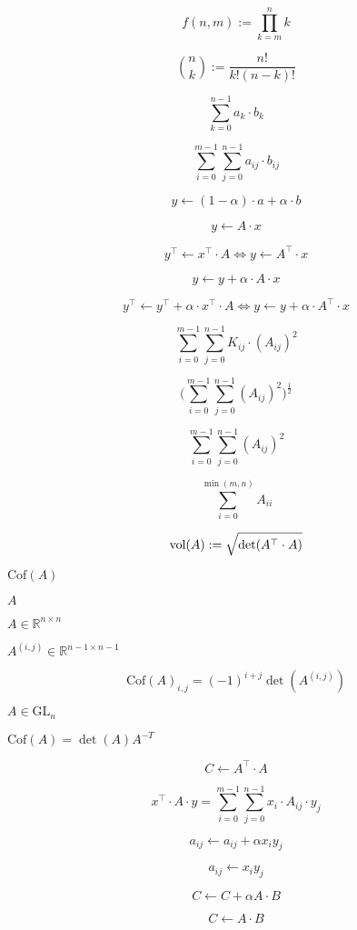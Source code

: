 \documentclass{article}
\begin{document}
\[ f(n,m) := \prod_{k=m}^n k \]
\pagebreak

\[ {n \choose k} := \frac{n!}{k!(n-k)!} \]
\pagebreak

\[\sum_{k=0}^{n-1} a_k\cdot b_k\]
\pagebreak

\[\sum_{i=0}^{m-1} \sum_{j=0}^{n-1} a_{ij} \cdot b_{ij}\]
\pagebreak

\[ y \leftarrow (1-\alpha)\cdot a + \alpha\cdot b \]
\pagebreak

\[ y \leftarrow A\cdot x \]
\pagebreak

\[ y^\top \leftarrow x^\top \cdot A \Longleftrightarrow y \leftarrow A^\top\cdot x \]
\pagebreak

\[ y \leftarrow y + \alpha\cdot A\cdot x \]
\pagebreak

\[ y^\top \leftarrow y^\top + \alpha\cdot x^\top \cdot A \Longleftrightarrow y \leftarrow y + \alpha\cdot A^\top\cdot x \]
\pagebreak

\[ \sum_{i=0}^{m-1}\sum_{j=0}^{n-1} K_{ij}\cdot (A_{ij})^2 \]
\pagebreak

\[ \Big(\sum_{i=0}^{m-1}\sum_{j=0}^{n-1} (A_{ij})^2\Big)^{\frac{1}{2}} \]
\pagebreak

\[ \sum_{i=0}^{m-1}\sum_{j=0}^{n-1} (A_{ij})^2\]
\pagebreak

\[ \sum_{i=0}^{\min(m,n)} A_{ii}\]
\pagebreak

\[ \textnormal{vol}(A) := \sqrt{\textnormal{det}(A^\top\cdot A)} \]
\pagebreak

$ \mathrm{Cof}(A) $
\pagebreak

$ A $
\pagebreak

$A \in \mathbb{R}^{n \times n}$
\pagebreak

$A^{(i,j)} \in \mathbb{R}^{n-1 \times n-1}$
\pagebreak

\[
  \mathrm{Cof}(A)_{i,j} = (-1)^{i+j} \det(A^{(i,j)})
\]
\pagebreak

$ A \in \mathrm{GL}_n$
\pagebreak

$ \mathrm{Cof}(A) = \det(A) A^{-T} $
\pagebreak

\[ C\leftarrow A^\top\cdot A \]
\pagebreak

\[ x^\top\cdot A\cdot y = \sum_{i=0}^{m-1}\sum_{j=0}^{n-1} x_i\cdot A_{ij}\cdot y_j\]
\pagebreak

\[ a_{ij} \leftarrow a_{ij} + \alpha x_i y_j \]
\pagebreak

\[ a_{ij} \leftarrow x_i y_j \]
\pagebreak

\[ C\leftarrow C + \alpha A\cdot B \]
\pagebreak

\[ C\leftarrow A\cdot B \]
\pagebreak
\end{document}
